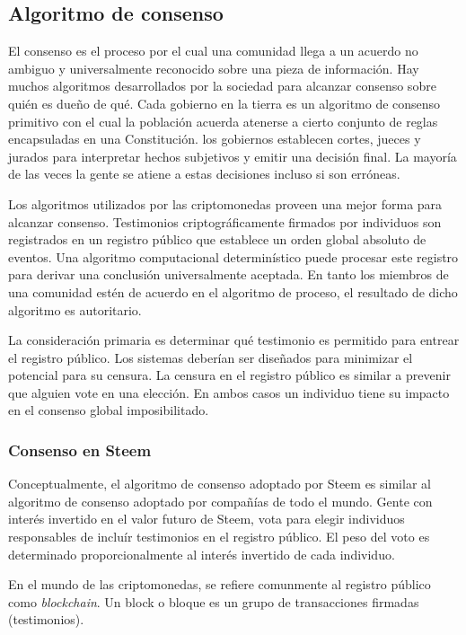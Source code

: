 \documentclass[a4paper,titlepage,final]{article}
\begin{document}
\subsection{Algoritmo de consenso}

El consenso es el proceso por el cual una comunidad llega a un acuerdo no ambiguo y universalmente reconocido sobre una pieza de información. Hay muchos algoritmos desarrollados por la sociedad para alcanzar consenso sobre quién es dueño de qué. Cada gobierno en la tierra es un algoritmo de consenso primitivo con el cual la población acuerda atenerse a cierto conjunto de reglas encapsuladas en una Constitución. los gobiernos establecen cortes, jueces y jurados para interpretar hechos subjetivos y emitir una decisión final. La mayoría de las veces la gente se atiene a estas decisiones incluso si son erróneas.

Los algoritmos utilizados por las criptomonedas proveen una mejor forma para alcanzar consenso. Testimonios criptográficamente firmados por individuos son registrados en un registro público que establece un orden global absoluto de eventos. Una algoritmo computacional determinístico puede procesar este registro para derivar una conclusión universalmente aceptada. En tanto los miembros de una comunidad estén de acuerdo en el algoritmo de proceso, el resultado de dicho algoritmo es autoritario.

La consideración primaria es determinar qué testimonio es permitido para entrear el registro público. Los sistemas deberían ser diseñados para minimizar el potencial para su censura. La censura en el registro público es similar a prevenir que alguien vote en una elección. En ambos casos un individuo tiene su impacto en el consenso global imposibilitado.

\subsubsection{Consenso en Steem}

Conceptualmente, el algoritmo de consenso adoptado por Steem es similar al algoritmo de consenso adoptado por compañías de todo el mundo. Gente con interés invertido en el valor futuro de Steem, vota para elegir individuos responsables de incluír testimonios en el registro público. El peso del voto es determinado proporcionalmente al interés invertido de cada individuo.

En el mundo de las criptomonedas, se refiere comunmente al registro público como \textit{blockchain}. Un block o bloque es un grupo de transacciones firmadas (testimonios).
\end{document}

